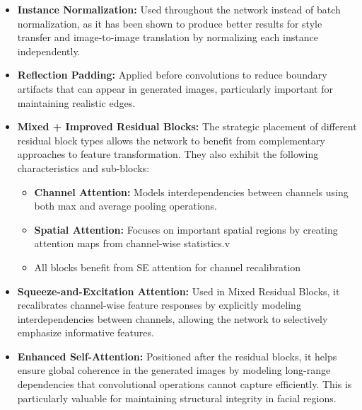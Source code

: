 \documentclass[twoside,english,notitlepage]{report}
\begin{document}
\begin{itemize}
    \item \textbf{Instance Normalization:} Used throughout the network instead of batch normalization, as it has been shown to produce better results for style transfer and image-to-image translation by normalizing each instance independently.

    \item \textbf{Reflection Padding:} Applied before convolutions to reduce boundary artifacts that can appear in generated images, particularly important for maintaining realistic edges.

    \item \textbf{Mixed + Improved Residual Blocks:} The strategic placement of different residual block types allows the network to benefit from complementary approaches to feature transformation. They also exhibit the following characteristics and sub-blocks:
    \begin{itemize}
        \item \textbf{Channel Attention:} Models interdependencies between channels using both max and average pooling operations.
        \item \textbf{Spatial Attention:} Focuses on important spatial regions by creating attention maps from channel-wise statistics.v
        \item All blocks benefit from SE attention for channel recalibration
    \end{itemize}

    \item \textbf{Squeeze-and-Excitation Attention:} Used in Mixed Residual Blocks, it recalibrates channel-wise feature responses by explicitly modeling interdependencies between channels, allowing the network to selectively emphasize informative features.

    \item \textbf{Enhanced Self-Attention:} Positioned after the residual blocks, it helps ensure global coherence in the generated images by modeling long-range dependencies that convolutional operations cannot capture efficiently. This is particularly valuable for maintaining structural integrity in facial regions.

\end{itemize}
\end{document}
